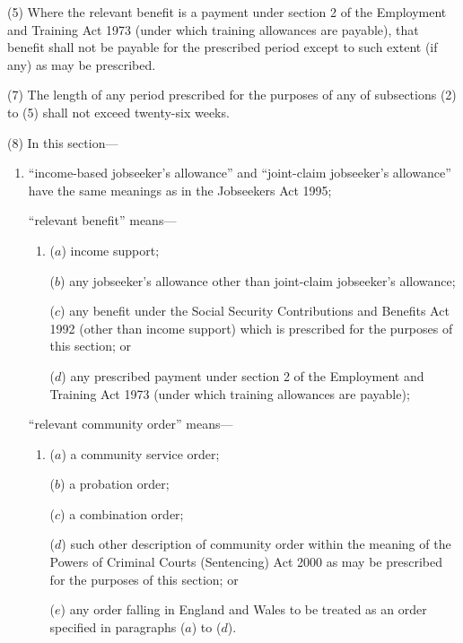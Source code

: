 \documentclass[12pt,a4paper]{article}
\begin{document}
(5) Where the relevant benefit is a payment under section 2 of the Employment and Training Act 1973 (under which training allowances are payable), that benefit shall not be payable for the prescribed period except to such extent (if any) as may be prescribed.


(7) The length of any period prescribed for the purposes of any of subsections (2)  to (5)  shall not exceed twenty-six weeks.

(8) In this section—
\begin{enumerate}\item[]
    “income-based jobseeker’s allowance” and “joint-claim jobseeker’s allowance” have the same meanings as in the Jobseekers Act 1995;

    “relevant benefit” means—
\begin{enumerate}\item[]
    ($a$) 
    income support;

    ($b$) 
    any jobseeker’s allowance other than joint-claim jobseeker’s allowance;

    ($c$) 
    any benefit under the Social Security Contributions and Benefits Act 1992 (other than income support) which is prescribed for the purposes of this section; or

    ($d$) 
    any prescribed payment under section 2 of the Employment and Training Act 1973 (under which training allowances are payable);
\end{enumerate}

    “relevant community order” means—
\begin{enumerate}\item[]
    ($a$) 
    a community service order;

    ($b$) 
    a probation order;

    ($c$) 
    a combination order;

    ($d$) 
    such other description of community order within the meaning of the Powers of Criminal Courts (Sentencing) Act 2000 as may be prescribed for the purposes of this section; or

    ($e$) 
    any order falling in England and Wales to be treated as an order specified in paragraphs ($a$)  to ($d$). 
\end{enumerate}
\end{enumerate}
\end{document}
